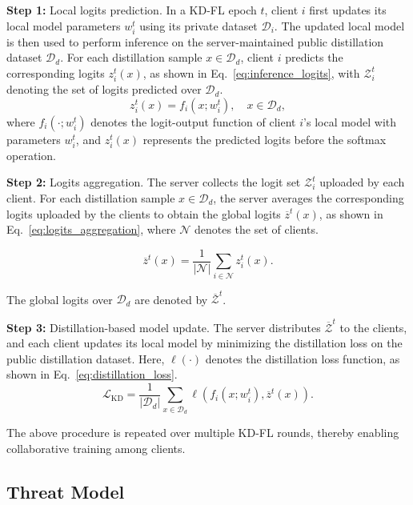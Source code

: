 \documentclass[lettersize,journal]{IEEEtran}
\begin{document}
\textbf{Step 1:} Local logits prediction. 
In a KD-FL epoch \(t\), client \(i\) first updates its local model parameters \(w_i^t\) using its private dataset \(\mathcal{D}_i\).
The updated local model is then used to perform inference on the server-maintained public distillation dataset \(\mathcal{D}_d\).
For each distillation sample \(x\in\mathcal{D}_d\), client \(i\) predicts the corresponding logits \(z_i^t(x)\), as shown in Eq.~\ref{eq:inference_logits}, with \(\mathcal{Z}_i^t\) denoting the set of logits predicted over \(\mathcal{D}_d\).
\begin{equation}
z_i^t(x)=f_i(x;w_i^t),\quad x\in\mathcal{D}_d,
\label{eq:inference_logits}
\end{equation}
where \(f_i(\cdot;w_i^t)\) denotes the logit-output function of client \(i\)'s local model with parameters \(w_i^t\), and \(z_i^t(x)\) represents the predicted logits before the softmax operation.

\textbf{Step 2:} Logits aggregation.
The server collects the logit set \(\mathcal{Z}_i^t\) uploaded by each client.
For each distillation sample \(x\in\mathcal{D}_d\), the server averages the corresponding logits uploaded by the clients to obtain the global logits \(\overline{z}^t(x)\), as shown in Eq.~\ref{eq:logits_aggregation}, where \(\mathcal{N}\) denotes the set of clients.

\begin{equation}
\overline{z}^t(x)=\frac{1}{|\mathcal{N}|}\sum_{i\in\mathcal{N}}z_i^t(x).
\label{eq:logits_aggregation}
\end{equation}

The global logits over \(\mathcal{D}_d\) are denoted by \(\overline{\mathcal{Z}}^t\).

\textbf{Step 3:} Distillation-based model update. 
The server distributes \(\overline{\mathcal{Z}}^t\) to the clients, and each client updates its local model by minimizing the distillation loss on the public distillation dataset. 
Here, $\ell(\cdot)$ denotes the distillation loss function, as shown in Eq.~\ref{eq:distillation_loss}.
\begin{equation}
\mathcal{L}_{\mathrm{KD}}=\frac{1}{|\mathcal{D}_d|}\sum_{x\in\mathcal{D}_d}\ell\left(f_i(x;w_i^t),\overline{z}^t(x)\right).
\label{eq:distillation_loss}
\end{equation}

The above procedure is repeated over multiple KD-FL rounds, thereby enabling collaborative training among clients.

\subsection{Threat Model}
\end{document}
